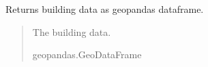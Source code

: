 \documentclass[letterpaper,10pt,english]{sphinxmanual}
\begin{document}
\begin{fulllineitems}

\begin{fulllineitems}
\label{\detokenize{pysewer:pysewer.preprocessing.Buildings.get_gdf}}
\pysigstartsignatures
{}
\pysigstopsignatures
\sphinxAtStartPar
Returns building data as geopandas dataframe.
\begin{quote}\begin{description}
\sphinxAtStartPar
The building data.

\sphinxAtStartPar
geopandas.GeoDataFrame

\end{description}\end{quote}

\end{fulllineitems}


\end{fulllineitems}

\end{document}
